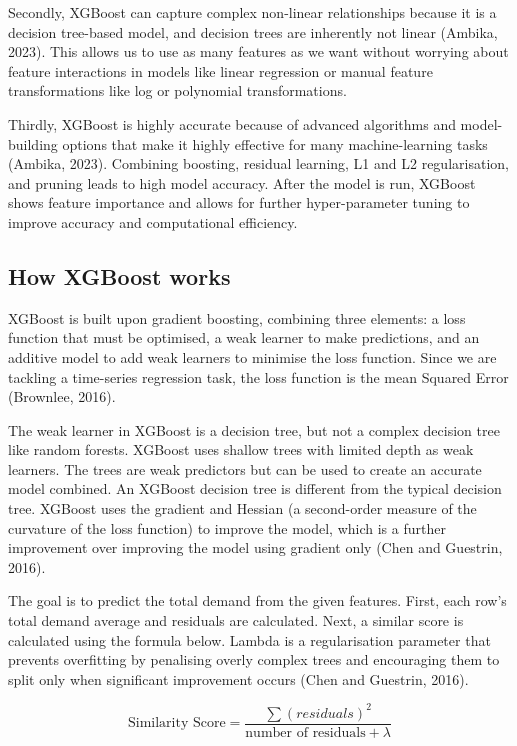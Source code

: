 \documentclass[mstat,12pt]{unswthesis}
\begin{document}
Secondly, XGBoost can capture complex non-linear relationships because
it is a decision tree-based model, and decision trees are inherently not
linear (Ambika, 2023). This allows us to use as many features as we want
without worrying about feature interactions in models like linear
regression or manual feature transformations like log or polynomial
transformations.

Thirdly, XGBoost is highly accurate because of advanced algorithms and
model-building options that make it highly effective for many
machine-learning tasks (Ambika, 2023). Combining boosting, residual
learning, L1 and L2 regularisation, and pruning leads to high model
accuracy. After the model is run, XGBoost shows feature importance and
allows for further hyper-parameter tuning to improve accuracy and
computational efficiency.

\subsection{How XGBoost works}\label{how-xgboost-works}

XGBoost is built upon gradient boosting, combining three elements: a
loss function that must be optimised, a weak learner to make
predictions, and an additive model to add weak learners to minimise the
loss function. Since we are tackling a time-series regression task, the
loss function is the mean Squared Error (Brownlee, 2016).

The weak learner in XGBoost is a decision tree, but not a complex
decision tree like random forests. XGBoost uses shallow trees with
limited depth as weak learners. The trees are weak predictors but can be
used to create an accurate model combined. An XGBoost decision tree is
different from the typical decision tree. XGBoost uses the gradient and
Hessian (a second-order measure of the curvature of the loss function)
to improve the model, which is a further improvement over improving the
model using gradient only (Chen and Guestrin, 2016).

The goal is to predict the total demand from the given features. First,
each row's total demand average and residuals are calculated. Next, a
similar score is calculated using the formula below. Lambda is a
regularisation parameter that prevents overfitting by penalising overly
complex trees and encouraging them to split only when significant
improvement occurs (Chen and Guestrin, 2016).

\[
\text{Similarity Score} = \frac{\sum{(residuals)}^2 }{\text{number of residuals} + \lambda}
\]
\end{document}
